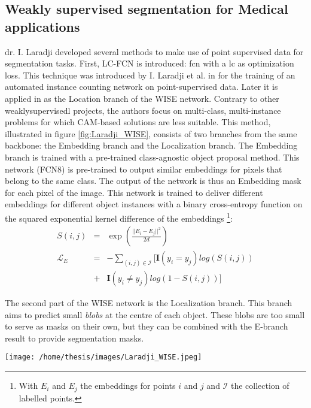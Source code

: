 \subsection{Weakly supervised segmentation for Medical applications}
\par{
    dr. I. Laradji developed several methods to make use of point supervised data for segmentation tasks.
    First, LC-FCN is introduced: \acrfull{fcn} with a \acrfull{lc} as optimization loss.
    This technique was introduced by I. Laradji et al. in \cite{Laradji2018} for the training of an automated instance counting network on point-supervised data.
    Later it is applied in \cite{Laradji2020} as the Location branch of the WISE network.
    Contrary to other \Gls{weaklysupervisedl} projects, the authors focus on multi-class, multi-instance problems for which CAM-based solutions are less suitable.
    This method, illustrated in figure \ref{fig:Laradji_WISE}, consists of two branches from the same backbone: the Embedding branch and the Localization branch.
    The Embedding branch is trained with a pre-trained class-agnostic object proposal method. 
    This network (FCN8) is pre-trained to output similar embeddings for pixels that belong to the same class.
    The output of the network is thus an Embedding mask for each pixel of the image. 
    This network is trained to deliver different embeddings for different object instances with a binary cross-entropy function on the squared exponential kernel difference of the embeddings
    \footnote{With $E_i$ and $E_j$ the embeddings for points $i$ and $j$ and $\mathcal{I}$ the collection of labelled points.}:
}
\begin{eqnarray*}
    S(i,j) &=& \exp \left( \frac{||E_i-E_j||^2}{2d} \right)\\
    \mathcal{L}_E &=& - \sum_{(i,j)\in \mathcal{I}} [  \mathbf{I}(y_i=y_j) log(S(i,j)) \\ &+& \mathbf{I}(y_i\neq y_j) log(1-S(i,j))  ]
\end{eqnarray*}
\par{
    The second part of the WISE network is the Localization branch. 
    This branch aims to predict small \textit{blobs} at the centre of each object.
    These blobs are too small to serve as masks on their own, but they can be combined with the E-branch result to provide segmentation masks.
}
\begin{SCfigure}[][htb]
    \texttt{[image: /home/thesis/images/Laradji\_WISE.jpeg]}
    \caption{Illustration from \cite{Laradji2020}. The WISE approach consists of two branches: The Embedding branch and the Localization branch.}
    \label{fig:Laradji_WISE}
\end{SCfigure}
